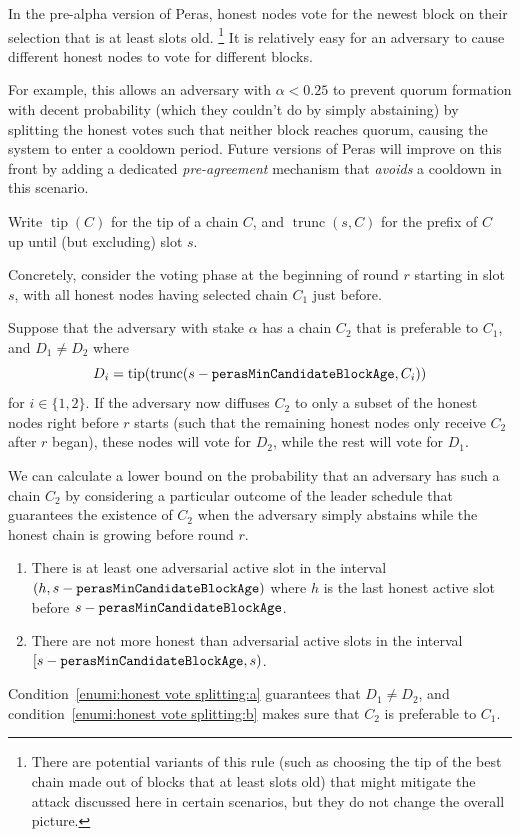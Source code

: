 In the pre-alpha version of Peras, honest nodes vote for the newest block on their selection that is at least \perasBlockMinSlots{} slots old.%
\footnote{There are potential variants of this rule (such as choosing the tip of the best chain made out of blocks that at least \perasBlockMinSlots{} slots old) that might mitigate the attack discussed here in certain scenarios, but they do not change the overall picture.}
It is relatively easy for an adversary to cause different honest nodes to vote for different blocks.

For example, this allows an adversary with $\alpha<0.25$ to prevent quorum formation with decent probability (which they couldn't do by simply abstaining) by splitting the honest votes such that neither block reaches quorum, causing the system to enter a cooldown period.
Future versions of Peras will improve on this front by adding a dedicated \emph{pre-agreement} mechanism that \emph{avoids} a cooldown in this scenario.

Write $\operatorname{tip}(C)$ for the tip of a chain $C$, and $\operatorname{trunc}(s,C)$ for the prefix of $C$ up until (but excluding) slot $s$.

Concretely, consider the voting phase at the beginning of round $r$ starting in slot $s$, with all honest nodes having selected chain $C_1$ just before.

Suppose that the adversary with stake $\alpha$ has a chain $C_2$ that is preferable to $C_1$, and $D_1 \neq D_2$ where \[D_i = \operatorname{tip}(\operatorname{trunc}(s-\mathtt{perasMinCandidateBlockAge},C_i))\] for $i\in\{1,2\}$.
If the adversary now diffuses $C_2$ to only a subset of the honest nodes right before $r$ starts (such that the remaining honest nodes only receive $C_2$ after $r$ began), these nodes will vote for $D_2$, while the rest will vote for $D_1$.

We can calculate a lower bound on the probability that an adversary has such a chain $C_2$ by considering a particular outcome of the leader schedule that guarantees the existence of $C_2$ when the adversary simply abstains while the honest chain is growing before round $r$.

\begin{enumerate}
\item\label{enumi:honest vote splitting:a}
  There is at least one adversarial active slot in the interval $(h,s-\mathtt{perasMinCandidateBlockAge})$ where $h$ is the last honest active slot before $s-\mathtt{perasMinCandidateBlockAge}$.
\item\label{enumi:honest vote splitting:b}
  There are not more honest than adversarial active slots in the interval $[s-\mathtt{perasMinCandidateBlockAge}, s)$.
\end{enumerate}
Condition~\ref{enumi:honest vote splitting:a} guarantees that $D_1\neq D_2$, and condition~\ref{enumi:honest vote splitting:b} makes sure that $C_2$ is preferable to $C_1$.

